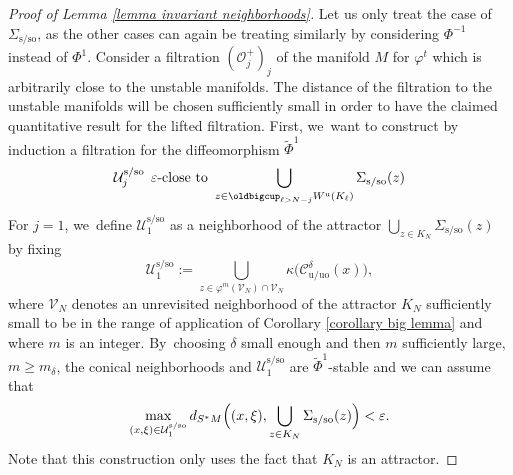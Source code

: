 \documentclass[JEP,XML,SOM,Unicode,NoEqCountersInSection,NoFloatCountersInSection,published]{cedram}
\newcommand{\rs}{\mathrm{s}}
\newcommand{\rso}{\mathrm{so}}
\newcommand{\ru}{\mathrm{u}}
\newcommand{\ruo}{\mathrm{uo}}
\theoremstyle{definition}
\theoremstyle{plain}
\newcommand{\Ccal}{\mathcal{C}}
\newcommand{\Ocal}{\mathcal{O}}
\newcommand{\Ucal}{\mathcal{U}}
\newcommand{\Vcal}{\mathcal{V}}
\begin{document}
\begin{proof}[Proof of Lemma \ref{lemma invariant neighborhoods}]
Let us only treat the case of $\Sigma_{\rs/\rso}$, as the other cases can again be treating similarly by considering $\Phi^{-1}$ instead of $\Phi^1$. Consider a filtration $(\Ocal_j^+)_j$ of the manifold $M$ for $\varphi^t$ which is arbitrarily close to the unstable manifolds. The distance of the filtration to the unstable manifolds will be chosen sufficiently small in order to have the claimed quantitative result for the lifted filtration. First, we~want to construct by induction a filtration for the diffeomorphism $\widetilde{\Phi}^1$
\begin{equation}\label{eq: proof lemma invariant neighborhood HR}
\Ucal_j^{\rs/\rso} \: \: \varepsilon\text{-close to } \bigcup_{z \in \oldbigcup_{\ell > N-j} W^\ru (K_\ell)} \Sigma_{\rs/\rso} (z)
\end{equation}
For $j = 1$, we~define $\Ucal_1^{\rs/\rso}$ as a neighborhood of the attractor $\bigcup_{z \in K_N} \Sigma_{\rs/\rso} (z)$ by fixing
\[
\Ucal_1^{\rs/\rso}:= \bigcup_{z \in \varphi^m (\Vcal_N) \cap \Vcal_N} \kappa \bigl(\Ccal_{\ru/\ruo}^{\delta} (x) \bigr),
\]
where $\Vcal_N$ denotes an unrevisited neighborhood of the attractor $K_N$ sufficiently small to be in the range of application of Corollary \ref{corollary big lemma} and where $m$ is an integer. By~choosing $\delta$ small enough and then $m$ sufficiently large, \ie $m \geq m_{\delta}$, the conical neighborhoods and $\Ucal_1^{\rs/\rso}$ are $\widetilde{\Phi}^1$-stable and we can assume that
\[
\max_{(x,\xi) \in \Ucal_1^{\rs/\rso}} d_{S^* M} \Bigl((x,\xi), \bigcup_{z \in K_N} \Sigma_{\rs/\rso}(z) \Bigr) < \varepsilon.
\]
Note that this construction only uses the fact that $K_N$ is an attractor.


\end{proof}
\end{document}
